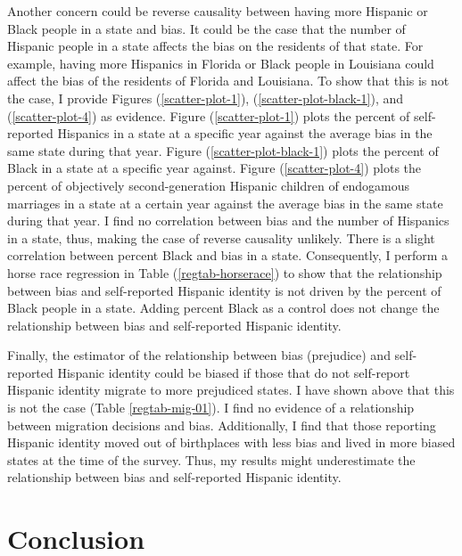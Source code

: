 \documentclass[12pt,english]{article}
\begin{document}
Another concern could be reverse causality between having more Hispanic or Black people in a state and bias. It could be the case that the number of Hispanic people in a state affects the bias on the residents of that state. For example, having more Hispanics in Florida or Black people in Louisiana could affect the  bias of the residents of Florida and Louisiana. To show that this is not the case, I provide Figures (\ref{scatter-plot-1}), (\ref{scatter-plot-black-1}), and (\ref{scatter-plot-4}) as evidence. Figure (\ref{scatter-plot-1}) plots the percent of self-reported Hispanics in a state at a specific year against the average  bias in the same state during that year. Figure (\ref{scatter-plot-black-1}) plots the percent of Black in a state at a specific year against. Figure (\ref{scatter-plot-4}) plots the percent of objectively second-generation Hispanic children of endogamous marriages in a state at a certain year against the average bias in the same state during that year. I find no correlation between bias and the number of Hispanics in a state, thus, making the case of reverse causality unlikely. There is a slight correlation between percent Black and bias in a state. Consequently, I perform a horse race regression in Table (\ref{regtab-horserace}) to show that the relationship between bias and self-reported Hispanic identity is not driven by the percent of Black people in a state. Adding percent Black as a control does not change the relationship between bias and self-reported Hispanic identity.

Finally, the estimator of the relationship between bias (prejudice) and self-reported Hispanic identity could be biased if those that do not self-report Hispanic identity migrate to more prejudiced states. I have shown above that this is not the case (Table \ref{regtab-mig-01}). I find no evidence of a relationship between migration decisions and bias. Additionally, I find that those reporting Hispanic identity moved out of birthplaces with less bias and lived in more biased states at the time of the survey. Thus, my results might underestimate the relationship between bias and self-reported Hispanic identity.

\section{Conclusion}\label{sec:conc}
\end{document}
